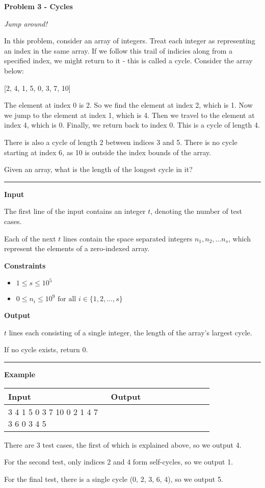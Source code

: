 \LARGE \textbf{Problem 3 - Cycles} \normalsize

{\itshape Jump around!}

In this problem, consider an array of integers. 
Treat each integer as representing an index in the same array. 
If we follow this trail of indicies along from a specified index, we might return to it - this is called a cycle. 
Consider the array below:

\begin{center}
    \LARGE [2, 4, 1, 5, 0, 3, 7, 10]
\end{center}

The element at index 0 is 2.
So we find the element at index 2, which is 1.
Now we jump to the element at index 1, which is 4.
Then we travel to the element at index 4, which is 0.
Finally, we return back to index 0.
This is a cycle of length 4.

There is also a cycle of length 2 between indices 3 and 5.
There is no cycle starting at index 6, as 10 is outside the index bounds of the array.

Given an array, what is the length of the longest cycle in it?

\vspace{8pt}
\hrule

\textbf{Input}

The first line of the input contains an integer $t$, denoting the number of test cases.

Each of the next $t$ lines contain the space separated integers $n_1, n_2, \dots n_s$, which represent the elements of a zero-indexed array.

\textbf{Constraints}

\begin{itemize}
    \item $1 \leq s \leq 10^5$
    \item $0 \leq n_i \leq 10^9 \text{ for all } i \in \{1, 2, \dots, s\}$
\end{itemize}

\textbf{Output}

$t$ lines each consisting of a single integer, the length of the array's largest cycle.

If no cycle exists, return 0.

\vspace{8pt}
\hrule

\textbf{Example}

\begin{table}[h]
    \centering
    \begin{tabular}{|p{0.4\linewidth}|p{0.4\linewidth}|}
        \hline
        Input & Output \\
        \hline
        3 \newline 2 4 1 5 0 3 7 10 \newline 5 0 2 1 4 \newline 2 7 3 6 0 3 4 5 & 
        \text{} \newline 4 \newline 1 \newline 5 \\
        \hline
    \end{tabular}
\end{table}

There are 3 test cases, the first of which is explained above, so we output 4.

For the second test, only indices 2 and 4 form self-cycles, so we output 1.

For the final test, there is a single cycle (0, 2, 3, 6, 4), so we output 5.